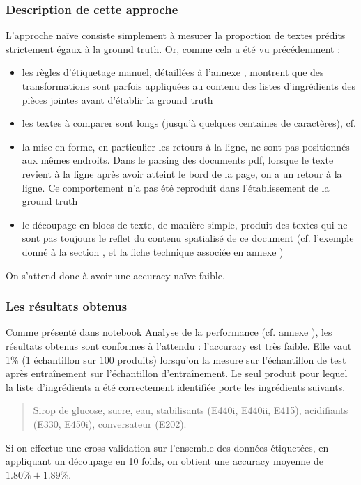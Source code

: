                 \subsubsection{Description de cette approche}

                L'approche \og naïve \fg consiste simplement à mesurer la proportion de textes prédits strictement égaux à la ground truth.
                Or, comme cela a été vu précédemment : 
                \begin{itemize}
                    \item les règles d'étiquetage manuel, détaillées à l'annexe , montrent que des transformations sont parfois appliquées au contenu des listes d'ingrédients des pièces jointes avant d'établir la ground truth
                    \item les textes à comparer sont longs (jusqu'à quelques centaines de caractères), cf. 
                    \item la mise en forme, en particulier les retours à la ligne, ne sont pas positionnés aux mêmes endroits. Dans le parsing des documents pdf, lorsque le texte revient à la ligne après avoir atteint le bord de la page, on a un retour à la ligne. Ce comportement n'a pas été reproduit dans l'établissement de la ground truth
                    \item le découpage en blocs de texte, de manière simple, produit des textes qui ne sont pas toujours le reflet du contenu spatialisé de ce document (cf. l'exemple donné à la section , et la fiche technique associée en annexe )
                \end{itemize}
                On s'attend donc à avoir une \og accuracy naïve \fg faible.

                \subsubsection{Les résultats obtenus}

                Comme présenté dans notebook \og Analyse de la performance \fg (cf. annexe ), les résultats obtenus sont conformes à l'attendu : l'accuracy est très faible.
                Elle vaut 1\% (1 échantillon sur 100 produits) lorsqu'on la mesure sur l'échantillon de test après entraînement sur l'échantillon d'entraînement.
                Le seul produit pour lequel la liste d'ingrédients a été correctement identifiée porte les ingrédients suivants.
                \begin{quotation}
                    Sirop de glucose, sucre, eau, stabilisants (E440i, E440ii, E415), acidifiants (E330, E450i), conversateur (E202).
                \end{quotation}
                Si on effectue une cross-validation sur l'ensemble des données étiquetées, en appliquant un découpage en 10 folds, on obtient une accuracy moyenne de $1.80\% \pm 1.89\%$.

